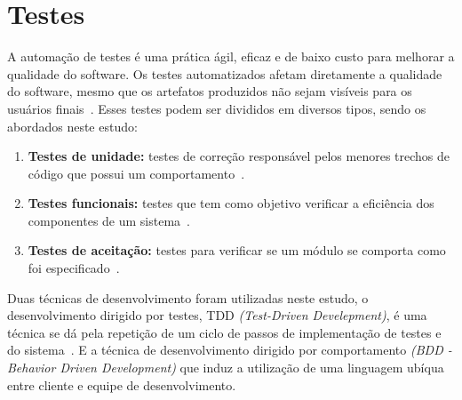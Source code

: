 \section{Testes}
\label{sec:testes}

A automação de testes é uma prática ágil, eficaz e de baixo custo para melhorar
a qualidade do software.
%
Os testes automatizados afetam diretamente a qualidade do software, mesmo que os artefatos  produzidos não sejam visíveis para os usuários finais~\cite{bernardo2011}.
Esses testes podem ser divididos em diversos tipos, sendo os abordados neste estudo:

\begin{enumerate}

\item \textbf{Testes de unidade:} testes de correção responsável pelos
menores trechos de código que possui um comportamento~\cite{bernardo2011}.

\item \textbf{Testes funcionais:} testes que tem como objetivo verificar a eficiência
dos componentes de um sistema~\cite{molinari2003}.

\item \textbf{Testes de aceitação:} testes para verificar se um módulo se comporta como foi especificado~\cite{martin2005}.

\end{enumerate}
Duas técnicas de desenvolvimento foram utilizadas neste estudo, o desenvolvimento dirigido por testes, TDD \textit{(Test-Driven Develepment)}, é uma técnica se dá pela repetição de um ciclo de passos de implementação de testes e do sistema~\cite{koskela2007}.
%
E a técnica de desenvolvimento dirigido por comportamento \textit{(BDD - Behavior Driven Development)} que induz a utilização de uma linguagem ubíqua entre cliente e equipe de desenvolvimento. 
%
	

